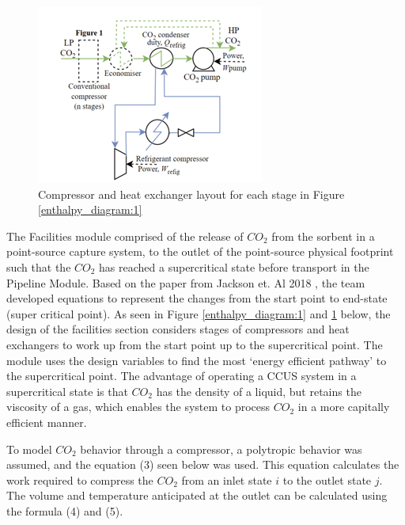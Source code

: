 \documentclass[balance,upint,subscriptcorrection,varvw,mathalfa=cal=boondoxo,spanish,french,vietnamese,russian,greek,pdf-a,colorlinks]{asmeconf}
\begin{document}
\begin{figure}[h!]
\centering\includegraphics[width=0.4\linewidth]{images/compression-hx.png}
\caption{Compressor and heat exchanger layout for each stage in Figure \ref{enthalpy_diagram:1}}\label{comphx:1}
\end{figure}
 
The Facilities module comprised of the release of \begin{math}{CO_2} \end{math} from the sorbent in a point-source capture system, to the outlet of the point-source physical footprint such that the \begin{math}{CO_2} \end{math} has reached a supercritical state before transport in the Pipeline Module. 
Based on the paper from Jackson et. Al 2018 \cite{jackson_2018}, the team developed equations to represent the changes from the start point to end-state (super critical point). As seen in Figure \ref{enthalpy_diagram:1} and \ref{comphx:1} below, the design of the facilities section considers stages of compressors and heat exchangers to work up from the start point up to the supercritical point. The module uses the design variables to find the most ‘energy efficient pathway’ to the supercritical point. The advantage of operating a CCUS system in a supercritical state is that \begin{math}{CO_2} \end{math} has the density of a liquid, but retains the viscosity of a gas, which enables the system to process \begin{math}{CO_2} \end{math} in a more capitally efficient manner. 


To model \begin{math}{CO_2} \end{math} behavior through a compressor, a polytropic behavior was assumed, and the equation (3) seen below was used. This equation calculates the work required to compress the \begin{math}{CO_2} \end{math} from an inlet state \begin{math}{i} \end{math} to the outlet state \begin{math}{j} \end{math}. The volume and temperature anticipated at the outlet can be calculated using the formula (4) and (5). 
\end{document}
